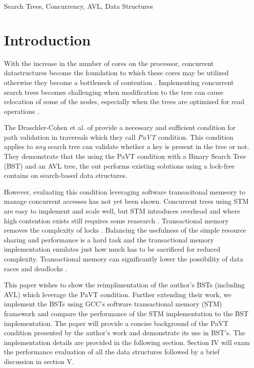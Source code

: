 \documentclass[conference]{IEEEtran}
\theoremstyle{definition}
\theoremstyle{theorem}
\begin{document}
\begin{IEEEkeywords}
Search Trees, Concurrency, AVL, Data Structures
\end{IEEEkeywords}

\section{Introduction}
With the increase in the number of cores on the processor, concurrent datastructures become the foundation to which these cores may be utilized otherwise they become a bottleneck of contention \cite{crain-cont}. Implementing concurrent search trees becomes challenging when modification to the tree can cause relocation of some of the nodes, especially when the trees are optimized for read operations \cite{draschler-pavt}.

The Draschler-Cohen et al. of \cite{draschler-pavt} provide a necessary and sufficient condition for path validation in traversals which they call \textit{PaVT} condition. This condition applies to \textit{any} search tree can validate whether a key is present in the tree or not. They demonstrate that the using the PaVT condition with a Binary Search Tree (BST) and an AVL tree, the out performs existing solutions using a lock-free contains on search-based data structures.

However, evaluating this condition leveraging software transacitonal memeory to manage concurrent accesses has not yet been shown. Concurrent trees using STM are easy to implement and scale well, but STM introduces overhead and where high contention exists still requires some reasearch \cite{bron}. Transactional memory removes the complexity of locks \cite{b4}. Balancing the usefulness of the simple resource sharing and performance is a hard task and the transactional memory implementation emulates just how much has to be sacrificed for reduced complexity. Transactional memory can significantly lower the possibility of data races and deadlocks \cite{b4}.

This paper wishes to show the reimplimentation of the author's BSTs (including AVL) which leverage the PaVT condition. Further extending their work, we implement the BSTs using GCC's software transactional memory (STM) framework and compare the performance of the STM implementation to the BST implementation. The paper will provide a concise background of the PaVT condition presented by the author's work and demonstrate its use in BST's. The implementation details are provided in the following section. Section IV will exam the performance evaluation of all the data structures followed by a brief discussion in section V.
\end{document}
